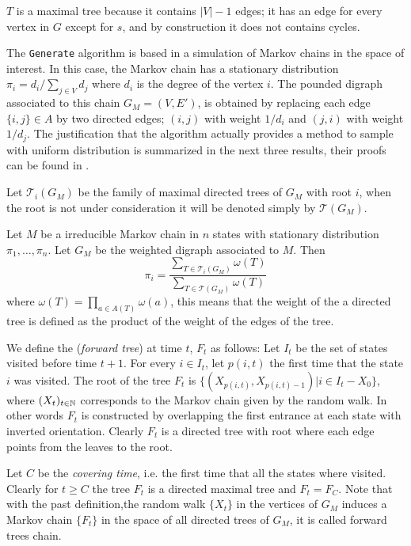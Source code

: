 $T$ is a maximal tree because it contains $|V| - 1$ edges; it has an edge for every vertex in $G$ except for $s$, and by construction it does not contains cycles.

The \texttt{Generate} algorithm is based in a simulation of Markov chains in the space of interest. In this case, the Markov chain has a stationary distribution $\pi_{i}=d_{i}/\sum_{j\in V} d_{j}$ where $d_{i}$ is the degree of the vertex $i$. The pounded digraph associated to this chain $G_M =(V,E')$, is obtained by replacing each edge $\{i,j\}\in A$ by two directed edges; $(i,j)$ with weight $1/d_{i}$ and $(j,i)$ with weight $1/d_{j}$. The justification that the algorithm actually provides a method to sample with uniform distribution is summarized in the next three results, their proofs can be found in \cite[Broder 89]{Broder89}.

Let $\mathcal{T}_{i}(G_{M})$ be the family of maximal directed trees of $G_{M}$ with root $i$, when the root is not under consideration it will be denoted simply by $\mathcal{T}(G_{M})$.

\begin{theorem}
Let $M$ be a irreducible Markov chain in $n$ states with stationary distribution $\pi_1, \dots, \pi_n$. Let $G_{M}$ be the weighted digraph associated to $M$. Then $$\pi_{i} = \frac{\sum_{ T \in \mathcal{T}_{i}(G_{M})} \omega (T)}{\sum _{T \in \mathcal{T}(G_{M})} \omega (T)}$$
where $\omega(T) = \prod_{a\in A(T)}\omega(a)$, this means that the weight of the a directed tree is defined as the product of the weight of the edges of the tree.
\end{theorem}

We define the (\textit{forward tree}) at time $t$, $F_{t}$ as follows: Let $I_{t}$ be the set of states visited before time $t+1$. For every $i\in I_{t}$, let $p(i,t)$ the first time that the state $i$ was visited. The root of the tree $F_{t}$ is $\{(X_{p(i,t)},X_{p(i,t)-1}) | i\in I_{t}-X_{0}\}$, where $(X_{t})_{t\in \mathbb{N}}$ corresponds to the Markov chain given by the random walk. In other words $F_{t}$ is constructed by overlapping the first entrance at each state with inverted orientation. Clearly $F_{t}$ is a directed tree with root where each edge points from the leaves to the root.

Let $C$ be the \textit{covering time}, i.e. the first time that all the states where visited. Clearly for $t\geq C$ the tree $F_{t}$ is a directed maximal tree and $F_{t}=F_{C}$. Note that with the past definition,the random walk $\{X_{t}\}$ in the vertices of $G_{M}$ induces a Markov chain $\{F_{t}\}$ in the space of all directed trees of $G_{M}$, it is called forward trees chain.


